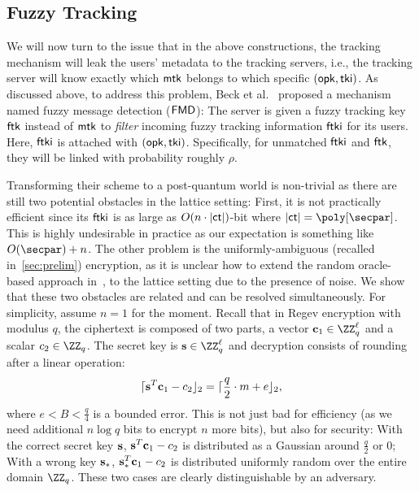 \subsection{Fuzzy Tracking}
We will now turn to the issue that in the above constructions, the tracking mechanism will leak the users' metadata to the tracking servers, i.e., the tracking server will know exactly which $\mathsf{mtk}$ belongs to which specific $(\mathsf{opk},\mathsf{tki})$. As discussed above, to address this problem, Beck et al.~\cite{CCS:BLMG21} proposed a mechanism named fuzzy message detection ($\mathsf{FMD}$): The server is given a fuzzy tracking key $\mathsf{ftk}$ instead of $\mathsf{mtk}$ to \emph{filter} incoming fuzzy tracking information $\mathsf{ftki}$ for its users. Here, $\mathsf{ftki}$ is attached with $(\mathsf{opk},\mathsf{tki})$. Specifically, for unmatched $\mathsf{ftki}$ and $\mathsf{ftk}$, they will be linked with probability roughly $\rho$. 


Transforming their scheme to a post-quantum world is non-trivial as there are still two potential obstacles in the lattice setting: First, it is not practically efficient since its $\mathsf{ftki}$ is as large as $O(n\cdot |\mathsf{ct}|)$-bit where $|\ct|=\poly[\secpar]$. This is highly undesirable in practice as our expectation is something like $O(\secpar)+n$. The other problem is the uniformly-ambiguous (recalled in~\cref{sec:prelim}) encryption, as it is unclear how to extend the random oracle-based approach in~\cite{CCS:BLMG21}, to the lattice setting due to the presence of noise.
We show that these two obstacles are related and can be resolved simultaneously.
For simplicity, assume $n=1$ for the moment. Recall that in Regev encryption with modulus $q$, the ciphertext is composed of two parts, a vector $\cn_1\in\ZZ_q^\ell$ and a scalar $c_2\in\ZZ_q$. The secret key is $\sn\in\ZZ_q^\ell$ and decryption consists of rounding after a linear operation:
$$\lceil\mathbf{s}^T\mathbf{c}_1-c_2\rfloor_2=\lceil\frac{q}{2}\cdot m + e\rfloor_2,
$$ where $e<B<\frac{q}{4}$ is a bounded error.
This is not just bad for efficiency (as we need additional $n\log q$ bits to encrypt $n$ more bits), but also for security: With the correct secret key $\mathbf{s}$, $\mathbf{s}^T\mathbf{c}_1-c_2$ is distributed as a Gaussian around $\frac{q}{2}$ or $0$; With a wrong key $\mathbf{s}_*$, $\mathbf{s}_*^T\mathbf{c}_1-c_2$ is distributed uniformly random over the entire domain $\ZZ_q$. These two cases are clearly distinguishable by an adversary.

